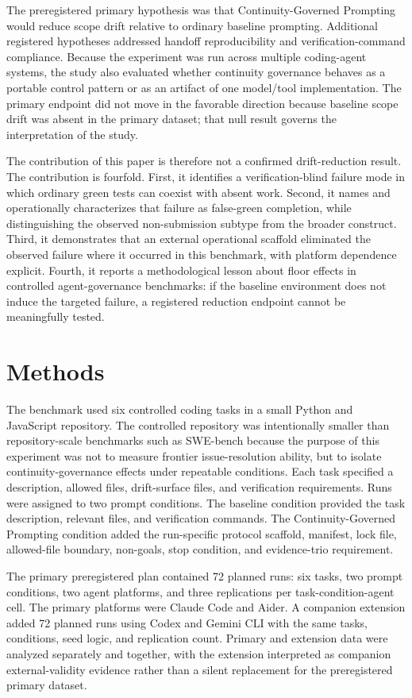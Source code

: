 \documentclass[11pt]{article}
\begin{document}
The preregistered primary hypothesis was that Continuity-Governed Prompting would reduce scope drift relative to ordinary baseline prompting. Additional registered hypotheses addressed handoff reproducibility and verification-command compliance. Because the experiment was run across multiple coding-agent systems, the study also evaluated whether continuity governance behaves as a portable control pattern or as an artifact of one model/tool implementation. The primary endpoint did not move in the favorable direction because baseline scope drift was absent in the primary dataset; that null result governs the interpretation of the study.

The contribution of this paper is therefore not a confirmed drift-reduction result. The contribution is fourfold. First, it identifies a verification-blind failure mode in which ordinary green tests can coexist with absent work. Second, it names and operationally characterizes that failure as false-green completion, while distinguishing the observed non-submission subtype from the broader construct. Third, it demonstrates that an external operational scaffold eliminated the observed failure where it occurred in this benchmark, with platform dependence explicit. Fourth, it reports a methodological lesson about floor effects in controlled agent-governance benchmarks: if the baseline environment does not induce the targeted failure, a registered reduction endpoint cannot be meaningfully tested.

\section{Methods}
The benchmark used six controlled coding tasks in a small Python and JavaScript repository. The controlled repository was intentionally smaller than repository-scale benchmarks such as SWE-bench because the purpose of this experiment was not to measure frontier issue-resolution ability, but to isolate continuity-governance effects under repeatable conditions. Each task specified a description, allowed files, drift-surface files, and verification requirements. Runs were assigned to two prompt conditions. The baseline condition provided the task description, relevant files, and verification commands. The Continuity-Governed Prompting condition added the run-specific protocol scaffold, manifest, lock file, allowed-file boundary, non-goals, stop condition, and evidence-trio requirement.

The primary preregistered plan contained 72 planned runs: six tasks, two prompt conditions, two agent platforms, and three replications per task-condition-agent cell. The primary platforms were Claude Code and Aider. A companion extension added 72 planned runs using Codex and Gemini CLI with the same tasks, conditions, seed logic, and replication count. Primary and extension data were analyzed separately and together, with the extension interpreted as companion external-validity evidence rather than a silent replacement for the preregistered primary dataset.
\end{document}
